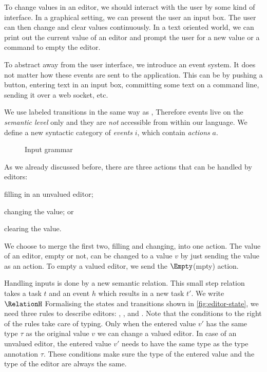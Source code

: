 To change values in an editor,
we should interact with the user by some kind of interface.
In a graphical setting,
we can present the user an input box.
The user can then change and clear values continuously.
In a text oriented world,
we can print out the current value of an editor
and prompt the user for a new value
or a command to empty the editor.

To abstract away from the user interface,
we introduce an event system.
It does not matter how these events are sent to the application.
This can be by pushing a button,
entering text in an input box,
committing some text on a command line,
sending it over a web socket,
etc.

%
We use labeled transitions in the same way as \textcite{school/maktoberdorf/PeytonJones01},
Therefore events live on the \emph{semantic level} only
and they are \emph{not} accessible from within our language.
We define a new syntactic category of \emph{events} $i$,
which contain \emph{actions} $a$.

\begin{figure}[h]
  \small
  \caption{Input grammar} \label{fig:input-grammar}
\end{figure}

As we already discussed before,
there are three actions that can be handled by editors:
\begin{enumerate*}
  \item filling in an unvalued editor;
  \item changing the value; or
  \item clearing the value.
\end{enumerate*}
We choose to merge the first two, filling and changing, into one action.
The value of an editor, empty or not, can be changed to a value $v$ by just sending the value as an action.
To empty a valued editor, we send the $\Empty$(mpty) action.

Handling inputs is done by a new semantic relation.
This small step relation takes a task $t$ and an event $h$ which results in a new task $t'$.
We write $\RelationH$
Formalising the states and transitions shown in \autoref{fig:editor-state},
we need three rules to describe editors:
, , and .
Note that the conditions to the right of the rules take care of typing.
Only when the entered value $v'$ has the same type $\tau$ as the original value $v$ we can change a valued editor.
In case of an unvalued editor,
the entered value $v'$ needs to have the same type as the type annotation $\tau$.
These conditions make sure the type of the entered value and the type of the editor are always the same.

